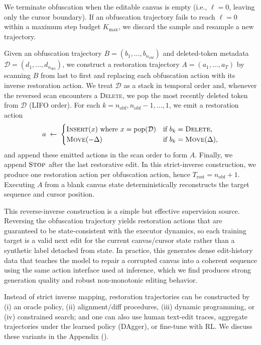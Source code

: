 \documentclass[11pt]{article}
\DeclareRobustCommand{\ph}[1]{#1}
\DeclareRobustCommand{\phA}{A}
\DeclareRobustCommand{\ph}[1]{\ifmmode\text{\phoenicianfont #1}\else{\phoenicianfont #1}\fi}
\DeclareRobustCommand{\phA}{\ph{\char"10900}} %
\DeclareRobustCommand{\ph}[1]{#1}
\DeclareRobustCommand{\phA}{A}
\DeclareRobustCommand{\Stop}{\ifmmode\text{\textsc{Stop}}\else\textsc{Stop}\fi}
\DeclareRobustCommand{\Insert}{\ifmmode\text{\textsc{Insert}}\else\textsc{Insert}\fi}
\begin{document}
We terminate obfuscation when the editable canvas is empty (i.e., $\ell=0$, leaving only the cursor boundary). If an obfuscation trajectory fails to reach $\ell=0$ within a maximum step budget $K_{\max}$, we discard the sample and resample a new trajectory.

Given an obfuscation trajectory $B=(b_1,\dots,b_{n_{\text{obf}}})$ and deleted-token metadata $\mathcal{D}=(d_1,\dots,d_{n_{\text{del}}})$, we construct a restoration trajectory $\phA=(a_1,\dots,a_T)$ by scanning $B$ from last to first and replacing each obfuscation action with its inverse restoration action. We treat $\mathcal{D}$ as a stack in temporal order and, whenever the reversed scan encounters a \textsc{Delete}, we pop the most recently deleted token from $\mathcal{D}$ (LIFO order). For each $k=n_{\text{obf}},n_{\text{obf}}-1,\dots,1$, we emit a restoration action
\[
a \;\leftarrow\;
\begin{cases}
\Insert(x) \text{ where } x=\mathrm{pop}(\mathcal{D}) & \text{if } b_k=\textsc{Delete},\\
\textsc{Move}(-\Delta) & \text{if } b_k=\textsc{Move}(\Delta),
\end{cases}
\]
and append these emitted actions in the scan order to form $\phA$. Finally, we append $\Stop$ after the last restorative edit. In this strict-inverse construction, we produce one restoration action per obfuscation action, hence $T_{\text{rest}}=n_{\text{obf}}+1$. Executing $\phA$ from a blank canvas state deterministically reconstructs the target sequence and cursor position.

This reverse-inverse construction is a simple but effective supervision source. Reversing the obfuscation trajectory yields restoration actions that are guaranteed to be state-consistent with the executor dynamics, so each training target is a valid next edit for the current canvas/cursor state rather than a synthetic label detached from state. In practice, this generates dense edit-history data that teaches the model to repair a corrupted canvas into a coherent sequence using the same action interface used at inference, which we find produces strong generation quality and robust non-monotonic editing behavior.

Instead of strict inverse mapping, restoration trajectories can be constructed by (i) an oracle policy, (ii) alignment/diff procedures, (iii) dynamic programming, or (iv) constrained search; and one can also use human text-edit traces, aggregate trajectories under the learned policy (DAgger), or fine-tune with RL. We discuss these variants in the Appendix ().
\end{document}
